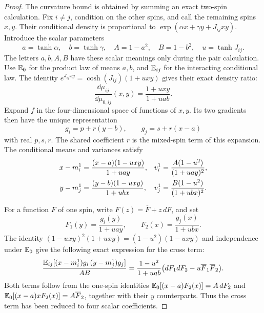 \begin{proof}
The curvature bound is obtained by summing an exact two-spin calculation.
Fix $i\ne j$, condition on the other spins, and call the remaining spins
$x,y$. Their conditional density is proportional to
$\exp(\alpha x+\gamma y+J_{ij}xy)$. Introduce the scalar parameters
\[
 a=\tanh\alpha,\quad b=\tanh\gamma,\quad
 A=1-a^2,\quad B=1-b^2,\quad u=\tanh J_{ij}.
\]
The letters $a,b,A,B$ have these scalar meanings only during the pair
calculation. Use $\mathbb E_0$ for the product law of means $a,b$, and
$\mathbb E_{ij}$ for the interacting conditional law. The identity
$e^{J_{ij}xy}=\cosh(J_{ij})(1+uxy)$ gives their exact density ratio:
\begin{equation}
 \frac{\dd\mu_{ij}}{\dd\mu_{0,ij}}(x,y)
       =\frac{1+uxy}{1+uab}.
 \label{eq:pair-density}
\end{equation}
Expand $f$ in the four-dimensional space of functions of $x,y$. Its
two gradients then have the unique representation
\[
 g_i=p+r(y-b),\qquad g_j=s+r(x-a)
\]
with real $p,s,r$. The shared coefficient $r$ is the mixed-spin term
of this expansion. The conditional means and variances satisfy
\begin{align}
 x-m_i^1&=\frac{(x-a)(1-uxy)}{1+uay},&
 v_i^1&=\frac{A(1-u^2)}{(1+uay)^2},\notag\\
 y-m_j^1&=\frac{(y-b)(1-uxy)}{1+ubx},&
 v_j^1&=\frac{B(1-u^2)}{(1+ubx)^2}.
 \label{eq:pair-conditional-identities}
\end{align}

For a function $F$ of one spin, write $F(z)=\overline F+z\,dF$, and set
\[
 F_1(y)=\frac{g_i(y)}{1+uay},\qquad
 F_2(x)=\frac{g_j(x)}{1+ubx}.
\]
The identity $(1-uxy)^2(1+uxy)=(1-u^2)(1-uxy)$ and independence under
$\mathbb E_0$ give the following exact expression for the cross term:
\begin{equation}
 \frac{\mathbb E_{ij}[(x-m_i^1)g_i\,(y-m_j^1)g_j]}{AB}
 =\frac{1-u^2}{1+uab}
       \bigl(dF_1dF_2-u\overline F_1\overline F_2\bigr).
 \label{eq:pair-cross-exact}
\end{equation}
Both terms follow from the one-spin identities
$\mathbb E_0[(x-a)F_2(x)]=A\,dF_2$ and
$\mathbb E_0[(x-a)xF_2(x)]=A\overline F_2$, together with their $y$
counterparts. Thus the cross term has been reduced to four scalar
coefficients.


\end{proof}

